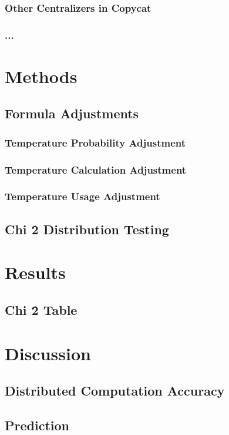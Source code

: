 \documentclass[a4paper]{article}
\begin{document}
        \subsubsection{Other Centralizers in Copycat}
        \subsubsection{...}
\section{Methods}
    \subsection{Formula Adjustments}
        \subsubsection{Temperature Probability Adjustment}
        \subsubsection{Temperature Calculation Adjustment}
        \subsubsection{Temperature Usage Adjustment}
    \subsection{Chi \^ 2 Distribution Testing}
\section{Results}
    \subsection{Chi \^ 2 Table}
\section{Discussion}
    \subsection{Distributed Computation Accuracy}
    \subsection{Prediction}
\end{document}
